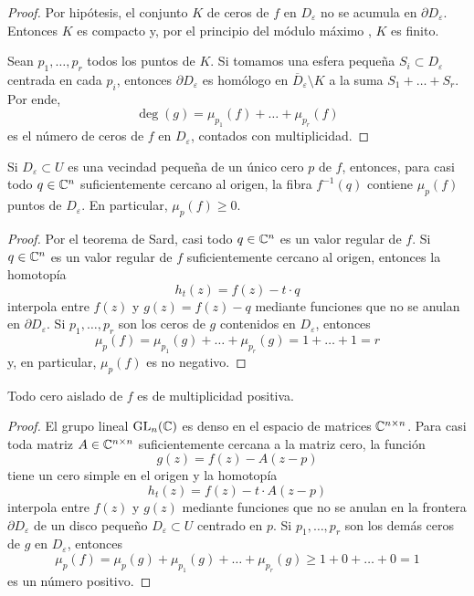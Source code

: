 \begin{proof}
Por hipótesis, el conjunto $K$ de ceros de $f$ en $D_\varepsilon$ no se acumula en $\partial D_\varepsilon$. Entonces $K$ es compacto y, por el principio del módulo máximo \cite[pp. 105-106]{gunning}, $K$ es finito.

Sean $p_1, \dots, p_r$ todos los puntos de $K$. Si tomamos una esfera pequeña $S_i \subset D_\varepsilon$ centrada en cada $p_i$, entonces $\partial D_\varepsilon$ es homólogo en $\overline D_\varepsilon \setminus K$ a la suma $S_1 + \dots + S_r$. Por ende,
$$\deg(g) = \mu_{p_1}(f) + \dots + \mu_{p_r}(f)$$
es el número de ceros de $f$ en $D_\varepsilon$, contados con multiplicidad.
\end{proof}

\begin{lemma}
Si $D_\varepsilon \subset U$ es una vecindad pequeña de un único cero $p$ de $f$, entonces, para casi todo $q \in \mathbb C^n$ suficientemente cercano al origen, la fibra $f^{-1}(q)$ contiene $\mu_p(f)$ puntos de $D_\varepsilon$. En particular, $\mu_p(f) \ge 0$.
\end{lemma}

\begin{proof}
Por el teorema de Sard, casi todo $q \in \mathbb C^n$ es un valor regular de $f$. Si $q \in \mathbb C^n$ es un valor regular de $f$ suficientemente cercano al origen, entonces la homotopía
$$h_t(z) = f(z) - t \cdot q$$
interpola entre $f(z)$ y $g(z) = f(z) - q$ mediante funciones que no se anulan en $\partial D_\varepsilon$. Si $p_1, \dots, p_r$ son los ceros de $g$ contenidos en $D_\varepsilon$, entonces
$$\mu_p(f) = \mu_{p_1}(g) + \dots + \mu_{p_r}(g) = 1 + \dots + 1 = r$$
y, en particular, $\mu_p(f)$ es no negativo.
\end{proof}

\begin{theorem}
Todo cero aislado de $f$ es de multiplicidad positiva.
\end{theorem}

\begin{proof}
El grupo lineal $\operatorname{GL}_n(\mathbb C)$ es denso en el espacio de matrices $\mathbb C^{n \times n}$. Para casi toda matriz $A \in \mathbb C^{n \times n}$ suficientemente cercana a la matriz cero, la función
$$g(z) = f(z) - A(z - p)$$
tiene un cero simple en el origen y la homotopía
$$h_t(z) = f(z) - t \cdot A(z - p)$$
interpola entre $f(z)$ y $g(z)$ mediante funciones que no se anulan en la frontera $\partial D_\varepsilon$ de un disco pequeño $D_\varepsilon \subset U$ centrado en $p$. Si $p_1, \dots, p_r$ son los demás ceros de $g$ en $D_\varepsilon$, entonces
$$\mu_p(f) = \mu_p(g) + \mu_{p_1}(g) + \dots + \mu_{p_r}(g) \ge 1 + 0 + \dots + 0 = 1$$
es un número positivo.
\end{proof}

